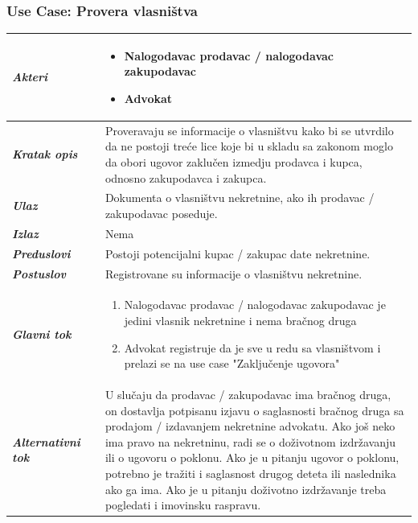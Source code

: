 \documentclass[20pt]{article}
\begin{document}
\subsubsection{\bfseries \large Use Case: Provera vlasni\v stva}
\begin{center}
\begin{tabular}{p{0.23\linewidth} p{0.77\linewidth}}
 \hline
 {\it \bfseries Akteri} & \begin{itemize}
    \item Nalogodavac prodavac / nalogodavac zakupodavac
    \item Advokat
\end{itemize}\\
\hline

 {\it \bfseries Kratak opis} & Proveravaju se informacije o vlasni\v stvu kako bi se utvrdilo da ne postoji tre\' ce lice koje bi u skladu sa zakonom moglo da obori ugovor zaklu\v cen izmedju prodavca i kupca, odnosno zakupodavca i zakupca.\\ 
 \hline
 
 {\it \bfseries Ulaz} & Dokumenta o vlasni\v stvu nekretnine, ako ih prodavac / zakupodavac poseduje.\\ 
 \hline
 
 {\it \bfseries Izlaz} & Nema\\
 \hline
 
 {\it \bfseries Preduslovi} & Postoji potencijalni kupac / zakupac date nekretnine.\\
 \hline

 {\it \bfseries Postuslov} & Registrovane su informacije o vlasni\v stvu nekretnine.\\
 \hline

     {\it \bfseries Glavni tok} &  
     \begin{enumerate}
        \item Nalogodavac prodavac / nalogodavac zakupodavac je jedini vlasnik nekretnine i nema bra\v cnog druga
        \item Advokat registruje da je sve u redu sa vlasni\v stvom
        i prelazi se na use case "Zaklju\v cenje ugovora"
    \end{enumerate}\\
 \hline
 {\it \bfseries Alternativni tok} & U slu\v caju da prodavac / zakupodavac ima bra\v cnog druga, on dostavlja potpisanu izjavu o saglasnosti bra\v cnog druga sa prodajom / izdavanjem nekretnine advokatu. Ako jo\v s neko ima pravo na nekretninu, radi se o do\v zivotnom izdr\v zavanju ili o ugovoru o poklonu. Ako je u pitanju ugovor o poklonu, potrebno je tra\v ziti i saglasnost drugog deteta ili naslednika ako ga ima. Ako je u pitanju do\v zivotno izdr\v zavanje treba pogledati i imovinsku raspravu. \\
 \hline
\end{tabular}
\end{center}
\end{document}
